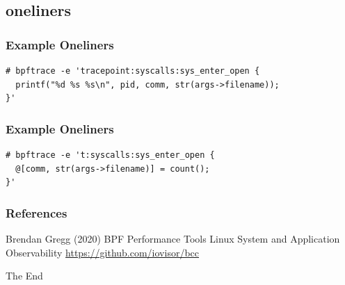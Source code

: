 \documentclass{beamer}
\begin{document}
\subsection{oneliners}
\begin{frame}[fragile] %
\frametitle{Example Oneliners}
\begin{example}
\begin{verbatim}
# bpftrace -e 'tracepoint:syscalls:sys_enter_open {
  printf("%d %s %s\n", pid, comm, str(args->filename));
}'
\end{verbatim}
\end{example}
\end{frame}


\begin{frame}[fragile] %
\frametitle{Example Oneliners}
\begin{example}
\begin{verbatim}
# bpftrace -e 't:syscalls:sys_enter_open { 
  @[comm, str(args->filename)] = count();
}'
\end{verbatim}
\end{example}
\end{frame}

\begin{frame}
\frametitle{References}
\footnotesize{
\begin{thebibliography}{99} %
 Brendan Gregg (2020)
\newblock BPF Performance Tools
\newblock Linux System and Application Observability
 \url{https://github.com/iovisor/bcc}
\end{thebibliography}
}
\end{frame}


\begin{frame}
\Huge{\centerline{The End}}
\end{frame}

\end{document}
